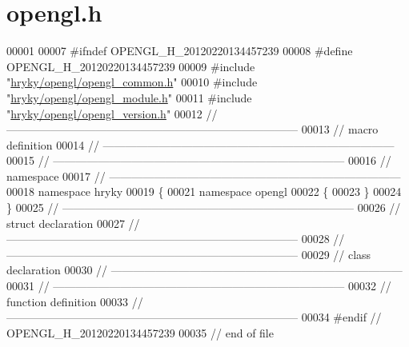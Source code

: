 \hypertarget{opengl_8h_source}{\section{opengl.\-h}
}

\begin{DoxyCode}
00001 
00007 \textcolor{preprocessor}{#ifndef OPENGL\_H\_20120220134457239}
00008 \textcolor{preprocessor}{}\textcolor{preprocessor}{#define OPENGL\_H\_20120220134457239}
00009 \textcolor{preprocessor}{}\textcolor{preprocessor}{#include "\hyperlink{opengl__common_8h}{hryky/opengl/opengl_common.h}"}
00010 \textcolor{preprocessor}{#include "\hyperlink{opengl__module_8h}{hryky/opengl/opengl_module.h}"}
00011 \textcolor{preprocessor}{#include "\hyperlink{opengl__version_8h}{hryky/opengl/opengl_version.h}"}
00012 \textcolor{comment}{//
      ------------------------------------------------------------------------------}
00013 \textcolor{comment}{// macro definition}
00014 \textcolor{comment}{//
      ------------------------------------------------------------------------------}
00015 \textcolor{comment}{//
      ------------------------------------------------------------------------------}
00016 \textcolor{comment}{// namespace}
00017 \textcolor{comment}{//
      ------------------------------------------------------------------------------}
00018 \textcolor{keyword}{namespace }hryky
00019 \{
00021 \textcolor{keyword}{namespace }opengl
00022 \{
00023 \}
00024 \}
00025 \textcolor{comment}{//
      ------------------------------------------------------------------------------}
00026 \textcolor{comment}{// struct declaration}
00027 \textcolor{comment}{//
      ------------------------------------------------------------------------------}
00028 \textcolor{comment}{//
      ------------------------------------------------------------------------------}
00029 \textcolor{comment}{// class declaration}
00030 \textcolor{comment}{//
      ------------------------------------------------------------------------------}
00031 \textcolor{comment}{//
      ------------------------------------------------------------------------------}
00032 \textcolor{comment}{// function definition}
00033 \textcolor{comment}{//
      ------------------------------------------------------------------------------}
00034 \textcolor{preprocessor}{#endif // OPENGL\_H\_20120220134457239}
00035 \textcolor{preprocessor}{}\textcolor{comment}{// end of file}
\end{DoxyCode}
